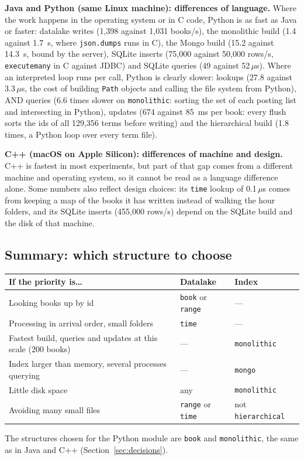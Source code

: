 \documentclass[11pt,a4paper]{article}
\newcommand{\code}[1]{\texttt{#1}}
\newcommand{\us}{\,$\mu$s}
\begin{document}
\textbf{Java and Python (same Linux machine): differences of language.} Where the work happens in
the operating system or in C code, Python is as fast as Java or faster: datalake writes (1,398 against
1,031 books/s), the monolithic build (1.4 against 1.7~s, where \code{json.dumps} runs in C), the Mongo
build (15.2 against 14.3~s, bound by the server), SQLite inserts (75,000 against 50,000 rows/s,
\code{executemany} in C against JDBC) and SQLite queries (49 against 52\us). Where an interpreted
loop runs per call, Python is clearly slower: lookups (27.8 against 3.3\us, the cost of building
\code{Path} objects and calling the file system from Python), AND queries (6.6 times slower on
\code{monolithic}: sorting the set of each posting list and intersecting in Python), updates
(674 against 85~ms per book: every flush sorts the ids of all 129,356 terms before writing) and the
hierarchical build (1.8 times, a Python loop over every term file).

\textbf{C++ (macOS on Apple Silicon): differences of machine and design.} C++ is fastest in most
experiments, but part of that gap comes from a different machine and operating system, so it cannot
be read as a language difference alone. Some numbers also reflect design choices: its \code{time}
lookup of 0.1\us{} comes from keeping a map of the books it has written instead of walking the hour
folders, and its SQLite inserts (455,000 rows/s) depend on the SQLite build and the disk of that
machine.

\subsection{Summary: which structure to choose}
\begin{table}[H]
\centering\small
\begin{tabularx}{\linewidth}{@{}Y l l@{}}
\toprule
If the priority is\ldots & Datalake & Index \\
\midrule
Looking books up by id & \code{book} or \code{range} & --- \\
Processing in arrival order, small folders & \code{time} & --- \\
Fastest build, queries and updates at this scale (200 books) & --- & \code{monolithic} \\
Index larger than memory, several processes querying & --- & \code{mongo} \\
Little disk space & any & \code{monolithic} \\
Avoiding many small files & \code{range} or \code{time} & not \code{hierarchical} \\
\bottomrule
\end{tabularx}
\end{table}
The structures chosen for the Python module are \code{book} and \code{monolithic}, the same as in
Java and C++ (Section~\ref{sec:decisions}).
\end{document}
